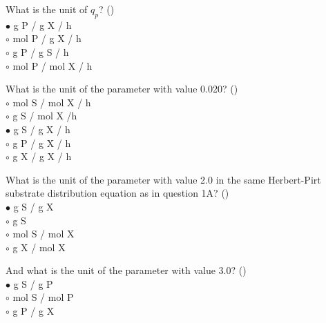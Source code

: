 \documentclass[]{beamer}
\begin{document}
\begin{frame}[shrink] {} 
\color{blue}
What is the unit of $q_{p}$? ({\color{green}{Q1b}})\\
\color{black}
\setlength{\parindent}{-0.4cm}
{\color{red}$\bullet$}  g P / g X / h \\
{\color{red}$\circ$}  mol P / g X / h \\
{\color{red}$\circ$}  g P / g S / h \\
{\color{red}$\circ$}  mol P / mol X / h \\
\end{frame}


\begin{frame}[shrink] {} 
\color{blue}
What is the unit of the parameter with value 0.020? ({\color{green}{Q1c}})\\
\color{black}
\setlength{\parindent}{-0.4cm}
{\color{red}$\circ$}  mol S / mol X / h \\
{\color{red}$\circ$}  g S / mol X /h \\
{\color{red}$\bullet$}  g S / g X / h \\
{\color{red}$\circ$}  g P / g X / h \\
{\color{red}$\circ$}  g X / g X / h \\
\end{frame}


\begin{frame}[shrink] {} 
\color{blue}
What is the unit of the parameter with value 2.0 in the same Herbert-Pirt substrate distribution equation as in question 1A? ({\color{green}{Q1d}})\\
\color{black}
\setlength{\parindent}{-0.4cm}
{\color{red}$\bullet$}  g S / g X \\
{\color{red}$\circ$}  g S \\
{\color{red}$\circ$}  mol S / mol X \\
{\color{red}$\circ$}  g X / mol X \\
\end{frame}


\begin{frame}[shrink] {} 
\color{blue}
And what is the unit of the parameter with value 3.0? ({\color{green}{Q1e}})\\
\color{black}
\setlength{\parindent}{-0.4cm}
{\color{red}$\bullet$}  g S / g P \\
{\color{red}$\circ$}  mol S / mol P \\
{\color{red}$\circ$}  g P / g X \\
\end{frame}
\end{document}
